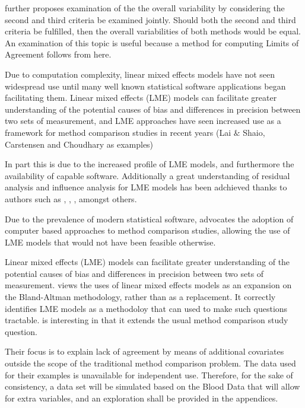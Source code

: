 \documentclass[12pt, a4paper]{report}
\theoremstyle{plain}
\theoremstyle{definition}
\theoremstyle{remark}
\begin{document}
	\citet{ARoy2009} further proposes examination of the the overall variability by considering the second and third criteria be examined jointly. Should both the second and third criteria be fulfilled, then the overall variabilities of both methods would be equal. An examination of this topic is useful because a method for computing Limits of Agreement follows from here.
	
	
	Due to computation complexity, linear mixed effects models have not seen widespread use until many well known statistical software applications began facilitating them. Linear mixed effects (LME) models can facilitate greater understanding of the potential causes of bias and differences in precision between two sets of measurement, and LME approaches have seen increased use as a framework for method comparison studies in recent years (Lai $\&$ Shaio, Carstensen and Choudhary as examples)
	
	
	 In part this is due to the increased profile of LME models, and furthermore the availability of capable software. 	Additionally a great understanding of residual analysis and influence analysis for LME models has been adchieved thanks to authors such as \citet{schabenberger}, \citet{Christensen}, \citet{cook86} \citet{west}, amongst others.
	
	
	Due to the prevalence of modern statistical software, \citet{BXC2008} advocates the adoption of computer based approaches to method comparison studies, allowing the use of LME models that would not have been feasible otherwise.
	
	
	
	
	Linear mixed effects (LME) models can facilitate greater
	understanding of the potential causes of bias and differences in
	precision between two sets of measurement. \citet{LaiShiao} views
	the uses of linear mixed effects models as an expansion on the
	Bland-Altman methodology, rather than as a replacement. It correctly identifies LME models as a methodoloy that can used to make such questions tractable. \citet{LaiShiao} is interesting in that it extends the usual method comparison study question. 
	
	 Their focus is to explain lack of agreement by means of additional covariates outside the scope of the traditional method comparison problem. The data used for their examples is unavailable for independent use. Therefore, for the sake of consistency, a data set will be simulated based on the Blood Data that will allow for extra variables, and an exploration shall be provided in the appendices.
	
\end{document}
